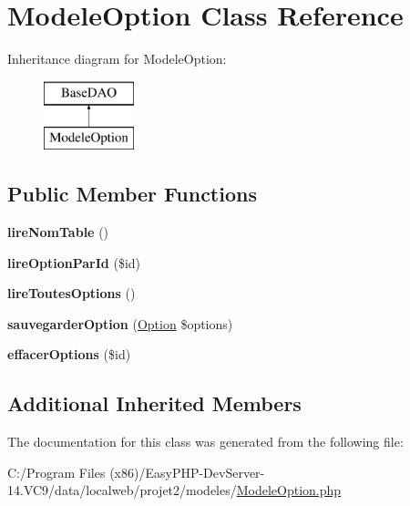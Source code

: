 \hypertarget{class_modele_option}{}\section{Modele\+Option Class Reference}
\label{class_modele_option}
Inheritance diagram for Modele\+Option\+:\begin{figure}[H]
\begin{center}
\leavevmode
\includegraphics[height=2.000000cm]{class_modele_option}
\end{center}
\end{figure}
\subsection*{Public Member Functions}
\begin{DoxyCompactItemize}
\item 
\mbox{\label{class_modele_option_a697d38eee03fff00f961b0ba7d7604c4}} 
{\bfseries lire\+Nom\+Table} ()
\item 
\mbox{\label{class_modele_option_aae92b30a54bef4755d11c14c5c34e50e}} 
{\bfseries lire\+Option\+Par\+Id} (\$id)
\item 
\mbox{\label{class_modele_option_ad2e0b80e7d8de6eb64670bdde5c5850d}} 
{\bfseries lire\+Toutes\+Options} ()
\item 
\mbox{\label{class_modele_option_a8b8aad49d63cb4c2fd9000f04accd6ad}} 
{\bfseries sauvegarder\+Option} (\hyperlink{class_option}{Option} \$options)
\item 
\mbox{\label{class_modele_option_acec8cd0943360b4dbecc386309a6cfe4}} 
{\bfseries effacer\+Options} (\$id)
\end{DoxyCompactItemize}
\subsection*{Additional Inherited Members}


The documentation for this class was generated from the following file\+:\begin{DoxyCompactItemize}
\item 
C\+:/\+Program Files (x86)/\+Easy\+P\+H\+P-\/\+Dev\+Server-\/14.\+V\+C9/data/localweb/projet2/modeles/\hyperlink{_modele_option_8php}{Modele\+Option.\+php}\end{DoxyCompactItemize}
